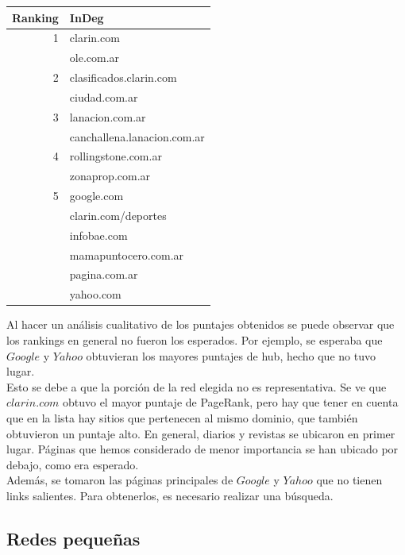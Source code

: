 \documentclass[a4paper]{article}
\begin{document}
\begin{tabular}{r|l}
Ranking & InDeg \\
\hline
1	&	clarin.com	\\
	&	ole.com.ar	\\
2	&	clasificados.clarin.com	\\
	&	ciudad.com.ar	\\
3	&	lanacion.com.ar	\\
	&	canchallena.lanacion.com.ar	\\
4	&	rollingstone.com.ar	\\
	&	zonaprop.com.ar	\\
5	&	google.com	\\
	&	clarin.com/deportes	\\
	&	infobae.com	\\
	&	mamapuntocero.com.ar	\\
	&	pagina.com.ar	\\
	&	yahoo.com	\\
  
\end{tabular} \newline \newline


Al hacer un análisis cualitativo de los puntajes obtenidos se puede observar que los rankings en general no fueron los esperados. Por ejemplo, se esperaba que $Google$ y $Yahoo$ obtuvieran los mayores puntajes de hub, hecho que no tuvo lugar.\\

Esto se debe a que la porción de la red elegida no es representativa. Se ve que $clarin.com$ obtuvo el mayor puntaje de PageRank, pero hay que tener en cuenta que en la lista hay sitios que pertenecen al mismo dominio, que también obtuvieron un puntaje alto. En general, diarios y revistas se ubicaron en primer lugar. Páginas que hemos considerado de menor importancia se han ubicado por debajo, como era esperado.\\

Además, se tomaron las páginas principales de $Google$ y $Yahoo$ que no tienen links salientes. Para obtenerlos, es necesario realizar una búsqueda.

\newpage
\subsection{Redes pequeñas} 
\end{document}
